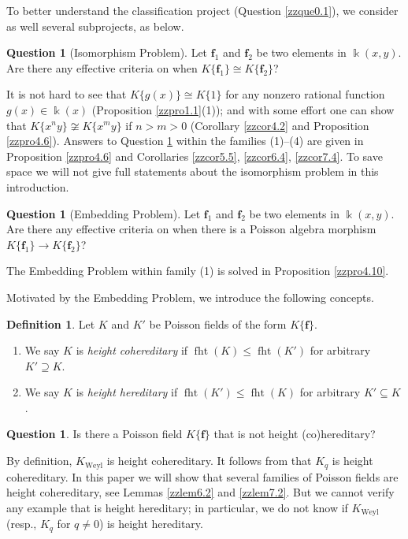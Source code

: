 \documentclass[12pt]{amsart}
\theoremstyle{plain}
\numberwithin{theorem}{section}
\numberwithin{equation}{theorem}
\theoremstyle{definition}
\newtheorem{definition}[theorem]{Definition}
\newtheorem{question}[theorem]{Question}
\DeclareMathOperator{\fht}{fht}
\newcommand \bff {{\mathbf{f}}}
\DeclareMathOperator{\Weyl}{Weyl}
\newcommand \Kweyl {K_{\Weyl}}
\begin{document}
To better understand the classification 
project (Question \ref{zzque0.1}), we 
consider as well several subprojects, as 
below.

\begin{question}[Isomorphism Problem]
\label{zzque0.4}
Let $\bff_1$ and $\bff_2$ be two elements 
in $\Bbbk(x,y)$. Are there any effective 
criteria on when $K\{\bff_1\}\cong K\{\bff_2\}$?
\end{question}

It is not hard to see that $K\{g(x)\} \cong 
K\{1\}$ for any nonzero rational function 
$g(x) \in \Bbbk(x)$ (Proposition 
\ref{zzpro1.1}(1)); and with some effort 
one can show that $K\{x^{n} y\} \not\cong 
K\{x^{m} y\}$ if $n>m>0$ (Corollary 
\ref{zzcor4.2} and Proposition 
\ref{zzpro4.6}). Answers to Question 
\ref{zzque0.4} within the families (1)--(4) 
are given in Proposition \ref{zzpro4.6} 
and Corollaries \ref{zzcor5.5}, 
\ref{zzcor6.4}, \ref{zzcor7.4}. To save 
space we will not give full statements 
about the isomorphism problem in this 
introduction. 

\begin{question}[Embedding Problem]
\label{zzque0.5}
Let $\bff_1$ and $\bff_2$ be two elements 
in $\Bbbk(x,y)$. Are there any effective 
criteria on when there is a Poisson algebra 
morphism $K\{\bff_1\}\to K\{\bff_2\}$?
\end{question}

The Embedding Problem within family (1) 
is solved in Proposition \ref{zzpro4.10}.

Motivated by the Embedding Problem, we 
introduce the following concepts. 

\begin{definition}
\label{zzdef0.6}
Let $K$ and $K'$ be Poisson fields of 
the form $K\{\bff\}$.
\begin{enumerate}
\item
We say $K$ is {\it height cohereditary} 
if $\fht(K) \leq
\fht(K')$ for arbitrary $K' \supseteq K$.
\item
We say $K$ is {\it height hereditary}
if $\fht(K')\leq \fht(K)$ for arbitrary 
$K' \subseteq K$.
\end{enumerate}
\end{definition}

\begin{question}
\label{zzque0.7} 
Is there a Poisson field $K\{\bff\}$ that 
is not height (co)hereditary?
\end{question}

By definition, $\Kweyl$ is height cohereditary. 
It follows from \cite[Corollary 5.9(2)]{HTWZ2} 
that $K_{q}$ is height cohereditary. In 
this paper we will show that several 
families of Poisson fields are height 
cohereditary, see Lemmas \ref{zzlem6.2} 
and \ref{zzlem7.2}. But we cannot verify 
any example that is height hereditary; 
in particular, we do not know if 
$\Kweyl$ (resp., $K_{q}$ for $q\neq 0$) 
is height hereditary. 
\end{document}
